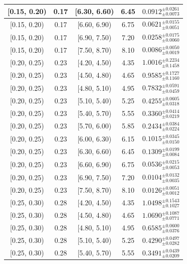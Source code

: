 \begin{longtable}{|c|c|c|c|c|}
\hline
[0.15, 0.20) & 0.17 & [6.30, 6.60) & 6.45 & $0.0912^{ \pm 0.0261 }_{ \pm 0.0073 }$ \\ 
\hline
[0.15, 0.20) & 0.17 & [6.60, 6.90) & 6.75 & $0.0621^{ \pm 0.0155 }_{ \pm 0.0051 }$ \\ 
\hline
[0.15, 0.20) & 0.17 & [6.90, 7.50) & 7.20 & $0.0258^{ \pm 0.0175 }_{ \pm 0.0060 }$ \\ 
\hline
[0.15, 0.20) & 0.17 & [7.50, 8.70) & 8.10 & $0.0086^{ \pm 0.0050 }_{ \pm 0.0019 }$ \\ 
\hline
[0.20, 0.25) & 0.23 & [4.20, 4.50) & 4.35 & $1.0016^{ \pm 0.2234 }_{ \pm 0.1458 }$ \\ 
\hline
[0.20, 0.25) & 0.23 & [4.50, 4.80) & 4.65 & $0.9585^{ \pm 0.1727 }_{ \pm 0.1160 }$ \\ 
\hline
[0.20, 0.25) & 0.23 & [4.80, 5.10) & 4.95 & $0.7832^{ \pm 0.0591 }_{ \pm 0.0459 }$ \\ 
\hline
[0.20, 0.25) & 0.23 & [5.10, 5.40) & 5.25 & $0.4255^{ \pm 0.0605 }_{ \pm 0.0318 }$ \\ 
\hline
[0.20, 0.25) & 0.23 & [5.40, 5.70) & 5.55 & $0.3360^{ \pm 0.0414 }_{ \pm 0.0219 }$ \\ 
\hline
[0.20, 0.25) & 0.23 & [5.70, 6.00) & 5.85 & $0.2434^{ \pm 0.0384 }_{ \pm 0.0224 }$ \\ 
\hline
[0.20, 0.25) & 0.23 & [6.00, 6.30) & 6.15 & $0.1015^{ \pm 0.0345 }_{ \pm 0.0150 }$ \\ 
\hline
[0.20, 0.25) & 0.23 & [6.30, 6.60) & 6.45 & $0.1309^{ \pm 0.0199 }_{ \pm 0.0084 }$ \\ 
\hline
[0.20, 0.25) & 0.23 & [6.60, 6.90) & 6.75 & $0.0536^{ \pm 0.0215 }_{ \pm 0.0053 }$ \\ 
\hline
[0.20, 0.25) & 0.23 & [6.90, 7.50) & 7.20 & $0.0104^{ \pm 0.0132 }_{ \pm 0.0035 }$ \\ 
\hline
[0.20, 0.25) & 0.23 & [7.50, 8.70) & 8.10 & $0.0126^{ \pm 0.0051 }_{ \pm 0.0012 }$ \\ 
\hline
[0.25, 0.30) & 0.28 & [4.20, 4.50) & 4.35 & $1.0498^{ \pm 0.1543 }_{ \pm 0.1027 }$ \\ 
\hline
[0.25, 0.30) & 0.28 & [4.50, 4.80) & 4.65 & $1.0690^{ \pm 0.1087 }_{ \pm 0.0771 }$ \\ 
\hline
[0.25, 0.30) & 0.28 & [4.80, 5.10) & 4.95 & $0.6585^{ \pm 0.0600 }_{ \pm 0.0376 }$ \\ 
\hline
[0.25, 0.30) & 0.28 & [5.10, 5.40) & 5.25 & $0.4290^{ \pm 0.0497 }_{ \pm 0.0282 }$ \\ 
\hline
[0.25, 0.30) & 0.28 & [5.40, 5.70) & 5.55 & $0.3491^{ \pm 0.0439 }_{ \pm 0.0209 }$ \\ 

\end{longtable}
